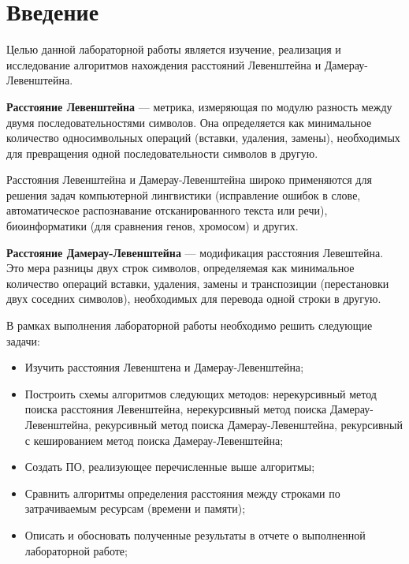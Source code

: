 \chapter*{Введение}

Целью данной лабораторной работы является изучение, реализация и исследование алгоритмов нахождения расстояний Левенштейна и Дамерау-Левенштейна.

\bigskip

\textbf{Расстояние Левенштейна} — метрика, измеряющая по модулю разность между двумя последовательностями символов. Она определяется как минимальное количество односимвольных операций (вставки, удаления, замены), необходимых для превращения одной последовательности символов в другую.

\bigskip

Расстояния Левенштейна и  Дамерау-Левенштейна широко применяются для решения задач компьютерной лингвистики (исправление ошибок в слове, автоматическое распознавание отсканированного текста или речи), биоинформатики (для сравнения генов, хромосом) и других.

\textbf{Расстояние Дамерау-Левенштейна} — модификация расстояния Левештейна. Это мера разницы двух строк символов, определяемая как минимальное количество операций вставки, удаления, замены и транспозиции (перестановки двух соседних символов), необходимых для перевода одной строки в другую.

\bigskip

В рамках выполнения лабораторной работы необходимо решить следующие задачи:

\begin{itemize}
	\item Изучить расстояния Левенштена и Дамерау-Левенштейна;
	\item Построить схемы алгоритмов следующих методов: нерекурсивный метод поиска расстояния Левенштейна, нерекурсивный метод поиска Дамерау-Левенштейна, рекурсивный метод поиска Дамерау-Левенштейна, рекурсивный с кешированием метод поиска Дамерау-Левенштейна;
	\item Создать ПО, реализующее перечисленные выше алгоритмы;
	\item Сравнить алгоритмы определения расстояния между строками по затрачиваемым ресурсам (времени и памяти);
	\item Описать и обосновать полученные результаты в отчете о выполненной лабораторной работе;
\end{itemize}

